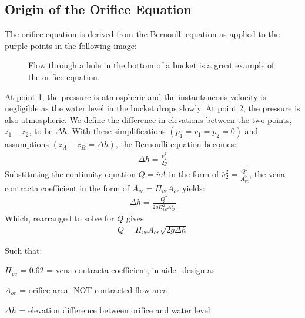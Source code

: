 \documentclass[letterpaper,10pt,english]{sphinxmanual}
\let\sphinxpxdimen\pdfpxdimen\else\newdimen\sphinxpxdimen
\begin{document}
\subsection{Origin of the Orifice Equation}
\label{\detokenize{Review/Review_Fluid_Mechanics:origin-of-the-orifice-equation}}
The orifice equation is derived from the Bernoulli equation as applied to the purple points in the following image:

\begin{figure}[htbp]
\centering
\capstart

\noindent\sphinxincludegraphics[width=650\sphinxpxdimen]{{hole_in_a_bucket}.png}
\caption{Flow through a hole in the bottom of a bucket is a great example of the orifice equation.}\label{\detokenize{Review/Review_Fluid_Mechanics:id11}}\label{\detokenize{Review/Review_Fluid_Mechanics:figure-hole-in-a-bucket}}\end{figure}

At point 1, the pressure is atmospheric and the instantaneous velocity is negligible as the water level in the bucket drops slowly. At point 2, the pressure is also atmospheric. We define the difference in elevations between the two points, \(z_1 - z_2\), to be \(\Delta h\). With these simplifications \((p_1 = \bar v_1 = p_2 = 0)\) and assumptions \((z_A - z_B = \Delta h)\), the Bernoulli equation becomes:
\begin{equation}\label{equation:Review/Review_Fluid_Mechanics:Review/Review_Fluid_Mechanics:24}
\begin{split}\Delta h = \frac{\bar v_2^2}{2g}\end{split}
\end{equation}
Substituting the continuity equation \(Q = \bar v A\) in the form of \(\bar v_2^2 = \frac{Q^2}{A_{vc}^2}\), the vena contracta coefficient in the form of \(A_{vc} = \Pi_{vc} A_{or}\) yields:
\begin{equation}\label{equation:Review/Review_Fluid_Mechanics:Review/Review_Fluid_Mechanics:25}
\begin{split}\Delta h = \frac{Q^2}{2g \Pi_{vc}^2 A_{or}^2}\end{split}
\end{equation}
Which, rearranged to solve for \(Q\) gives 
\begin{equation}\label{equation:Review/Review_Fluid_Mechanics:orifice_equation}
\begin{split}  Q = \Pi_{vc} A_{or} \sqrt{2g\Delta h}\end{split}
\end{equation}
\begin{DUlineblock}{0em}
\item[] Such that:
\item[] \(\Pi_{vc}\) = 0.62 = vena contracta coefficient, in aide\_design as 
\item[] \(A_{or}\) = orifice area- NOT contracted flow area
\item[] \(\Delta h\) = elevation difference between orifice and water level
\end{DUlineblock}
\end{document}
